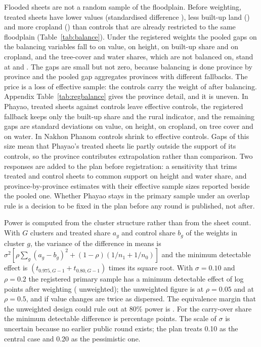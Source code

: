 Flooded sheets are not a random sample of the floodplain. Before weighting, treated sheets have lower values (standardised difference \radarSmdValue), less built-up land (\radarSmdBuilt) and more cropland (\radarSmdCrop) than controls that are already restricted to the same floodplain (Table~\ref{tab:balance}). Under the registered weights the pooled gaps on the balancing variables fall to \radarGapValueW{} on value, \radarGapHeightW{} on height, \radarGapBuiltW{} on built-up share and \radarGapCropW{} on cropland, and the tree-cover and water shares, which are not balanced on, stand at \radarSmdTreeW{} and \radarSmdWaterW. The gaps are small but not zero, because balancing is done province by province and the pooled gap aggregates provinces with different fallbacks. The price is a loss of effective sample: the \radarControls{} controls carry the weight of \radarEssBalance{} after balancing. Appendix Table~\ref{tab:regbalance} gives the province detail, and it is uneven. In Phayao, \regTreatedPhayao{} treated sheets against \regControlsPhayao{} controls leave \regEssPhayao{} effective controls, the registered fallback keeps only the built-up share and the rural indicator, and the remaining gaps are \regGapValuePhayao{} standard deviations on value, \regGapHeightPhayao{} on height, \regGapCropPhayao{} on cropland, \regGapTreePhayao{} on tree cover and \regGapWaterPhayao{} on water. In Nakhon Phanom \regControlsNakhonPhanom{} controls shrink to \regEssNakhonPhanom{} effective controls. Gaps of this size mean that Phayao's treated sheets lie partly outside the support of its controls, so the province contributes extrapolation rather than comparison. Two responses are added to the plan before registration: a sensitivity that trims treated and control sheets to common support on height and water share, and province-by-province estimates with their effective sample sizes reported beside the pooled one. Whether Phayao stays in the primary sample under an overlap rule is a decision to be fixed in the plan before any round is published, not after.

Power is computed from the cluster structure rather than from the sheet count. With $G$ clusters and treated share $a_g$ and control share $b_g$ of the weights in cluster $g$, the variance of the difference in means is $\sigma^2[\rho\sum_g (a_g - b_g)^2 + (1-\rho)(1/n_1 + 1/n_0)]$ and the minimum detectable effect is $(t_{0.975,G-1} + t_{0.80,G-1})$ times its square root. With $\sigma = 0.10$ and $\rho = 0.2$ the registered primary sample has a minimum detectable effect of \regMdePooled{} log points after weighting (\radarMde{} unweighted); the unweighted figure is \radarMdeIccLow{} at $\rho = 0.05$ and \radarMdeIccHigh{} at $\rho = 0.5$, and \radarMdeHigh{} if value changes are twice as dispersed. The equivalence margin that the unweighted design could rule out at 80\% power is \radarEquiv. For the carry-over share the minimum detectable difference is \radarCarry{} percentage points. The scale of $\sigma$ is uncertain because no earlier public round exists; the plan treats 0.10 as the central case and 0.20 as the pessimistic one.

